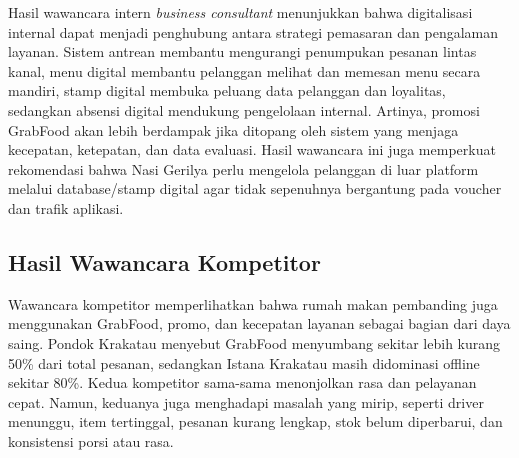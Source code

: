 Hasil wawancara intern \textit{business consultant} menunjukkan bahwa digitalisasi internal dapat menjadi penghubung antara strategi pemasaran dan pengalaman layanan. Sistem antrean membantu mengurangi penumpukan pesanan lintas kanal, menu digital membantu pelanggan melihat dan memesan menu secara mandiri, stamp digital membuka peluang data pelanggan dan loyalitas, sedangkan absensi digital mendukung pengelolaan internal. Artinya, promosi GrabFood akan lebih berdampak jika ditopang oleh sistem yang menjaga kecepatan, ketepatan, dan data evaluasi. Hasil wawancara ini juga memperkuat rekomendasi bahwa Nasi Gerilya perlu mengelola pelanggan di luar platform melalui database/stamp digital agar tidak sepenuhnya bergantung pada voucher dan trafik aplikasi.

\subsection{Hasil Wawancara Kompetitor}
Wawancara kompetitor memperlihatkan bahwa rumah makan pembanding juga menggunakan GrabFood, promo, dan kecepatan layanan sebagai bagian dari daya saing. Pondok Krakatau menyebut GrabFood menyumbang sekitar lebih kurang 50\% dari total pesanan, sedangkan Istana Krakatau masih didominasi offline sekitar 80\%. Kedua kompetitor sama-sama menonjolkan rasa dan pelayanan cepat. Namun, keduanya juga menghadapi masalah yang mirip, seperti driver menunggu, item tertinggal, pesanan kurang lengkap, stok belum diperbarui, dan konsistensi porsi atau rasa.

